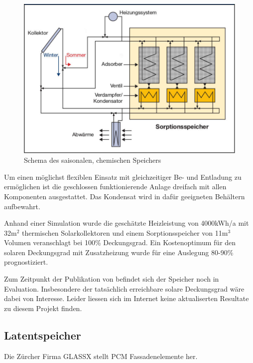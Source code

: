\documentclass[11pt,a4paper]{scrartcl}
\begin{document}
\begin{figure}[h!]
\begin{center}
\includegraphics[scale=1]{images/energiehaus.jpg}
\caption{Schema des saisonalen, chemischen Speichers \cite{BINE2}}
\label{fig:Saisonaler Speicher}
\end{center}
\end{figure}

Um einen möglichst flexiblen Einsatz mit gleichzeitiger Be- und Entladung zu
ermöglichen ist die geschlossen funktionierende Anlage dreifach mit allen
Komponenten ausgestattet. Das Kondensat wird in dafür geeigneten Behältern
aufbewahrt. 

Anhand einer Simulation wurde die geschätzte Heizleistung von
4000kWh/a mit 32m$^2$ thermischen Solarkollektoren und einem
Sorptionsspeicher von 11m$^3$ Volumen veranschlagt bei 100\% Deckungsgrad. Ein Kostenoptimum für den solaren
Deckungsgrad mit Zusatzheizung wurde für eine Auslegung 80-90\% prognostiziert.

Zum Zeitpunkt der Publikation von \cite{BINE2} befindet sich der Speicher noch
in Evaluation. Insbesondere der tatsächlich erreichbare solare Deckungsgrad wäre
dabei von Interesse. Leider liessen sich im Internet keine aktualiserten
Resultate zu diesem Projekt finden.
\subsection{Latentspeicher}
Die Zürcher Firma GLASSX stellt PCM Fassadenelemente her. 
\end{document}

